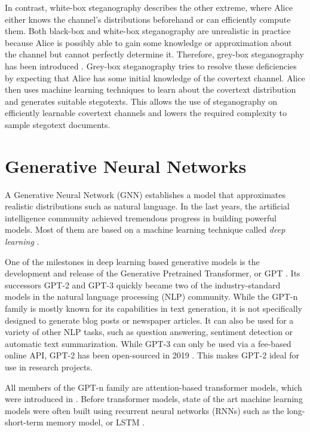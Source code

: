 In contrast, white-box steganography describes the other extreme, where Alice either knows the channel's distributions beforehand or can efficiently compute them.
Both black-box and white-box steganography are unrealistic in practice because Alice is possibly able to gain some knowledge or approximation about the channel but cannot perfectly determine it.
Therefore, grey-box steganography has been introduced \cite{LRW2013}.
Grey-box steganography tries to resolve these deficiencies by expecting that Alice has some initial knowledge of the covertext channel.
Alice then uses machine learning techniques to learn about the covertext distribution and generates suitable stegotexts.
This allows the use of steganography on efficiently learnable covertext channels and lowers the required complexity to sample stegotext documents.

\section{Generative Neural Networks}
\label{sec:generative-neural-networks}

A Generative Neural Network (GNN) establishes a model that approximates realistic distributions such as natural language.
In the last years, the artificial intelligence community achieved tremendous progress in building powerful models.
Most of them are based on a machine learning technique called \emph{deep learning} \cite{DeepLearning2015}.

One of the milestones in deep learning based generative models is the development and release of the Generative Pretrained Transformer, or GPT \cite{OpenAI2018}.
Its successors GPT-2 \cite{OpenAI2019} and GPT-3 \cite{OpenAI2020} quickly became two of the industry-standard models in the natural language processing (NLP) community.
While the GPT-n family is mostly known for its capabilities in text generation, it is not specifically designed to generate blog posts or newspaper articles.
It can also be used for a variety of other NLP tasks, such as question answering, sentiment detection or automatic text summarization.
While GPT-3 can only be used via a fee-based online API, GPT-2 has been open-sourced in 2019 \cite{GPTReleasePlan2019}.
This makes GPT-2 ideal for use in research projects.

All members of the GPT-n family are attention-based transformer models, which were introduced in \cite{Vaswani2017}.
Before transformer models, state of the art machine learning models were often built using recurrent neural networks (RNNs) such as the long-short-term memory model, or LSTM \cite{Hochreiter1997}.

